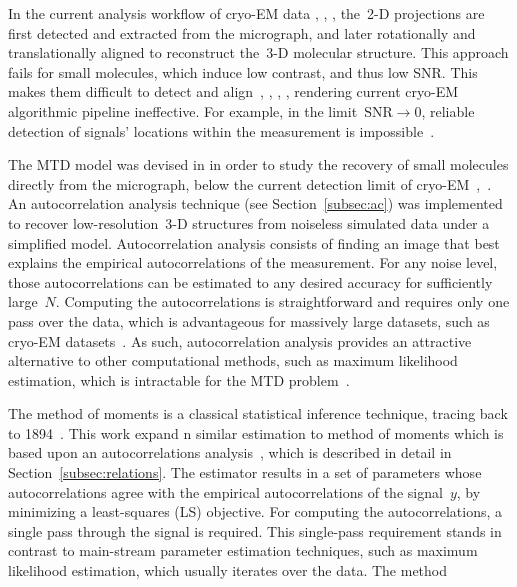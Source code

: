 \documentclass{article}
\begin{document}
In the current analysis workflow of \mbox{cryo-EM} data \cite{bendory2020single}, \cite{scheres2012relion}, \cite{punjani2017cryosparc}, the~\mbox{2-D} projections are first detected and extracted from the micrograph, and later rotationally and translationally aligned to reconstruct the~\mbox{3-D} molecular structure. This approach fails for small molecules, which induce low contrast, and thus low SNR. This makes them difficult to detect and align~\cite{bendory2018toward}, \cite{henderson1995potential}, \cite{bendory2020single}, \cite{aguerrebere2016fundamental}, rendering current \mbox{cryo-EM} algorithmic pipeline ineffective. For example, in the limit~\mbox{$\text{SNR} \rightarrow 0$}, reliable detection of signals' locations within the measurement is impossible~\cite[Proposition~3.1]{bendory2018toward}.

The MTD model was devised in \cite{bendory2018toward} in order to study the recovery of small molecules directly from the micrograph, below the current detection limit of \mbox{cryo-EM}~\cite{henderson1995potential},~\cite{d2021current}. An autocorrelation analysis technique (see Section~\ref{subsec:ac}) was implemented to recover \mbox{low-resolution}~\mbox{3-D} structures from noiseless simulated data under a simplified model. Autocorrelation analysis consists of finding an image that best explains the empirical autocorrelations of the measurement. For any noise level, those autocorrelations can be estimated to any desired accuracy for sufficiently large~$N$. Computing the autocorrelations is straightforward and requires only one pass over the data, which is advantageous for massively large datasets, such as \mbox{cryo-EM} datasets~\cite{bendory2020single}. As such, autocorrelation analysis provides an attractive alternative to other computational methods, such as maximum likelihood estimation, which is intractable for the MTD problem~\cite{lan2020multi}.


The method of moments is a classical statistical inference technique, tracing back to 1894~\cite{pearson1894contributions}. This work expand n similar estimation to method of moments which is based upon an autocorrelations analysis~\cite{bendory2019multi}, which is described in detail in Section~\ref{subsec:relations}. The estimator results in a set of parameters whose autocorrelations agree with the empirical autocorrelations of the signal~$y$, by minimizing a {least-squares} (LS) objective. {For computing} the autocorrelations, a single pass through the signal is required. This {single-pass requirement} stands in contrast to main-stream parameter estimation techniques, such as  maximum likelihood {estimation}, which usually {iterates} over the data. The method
\end{document}
